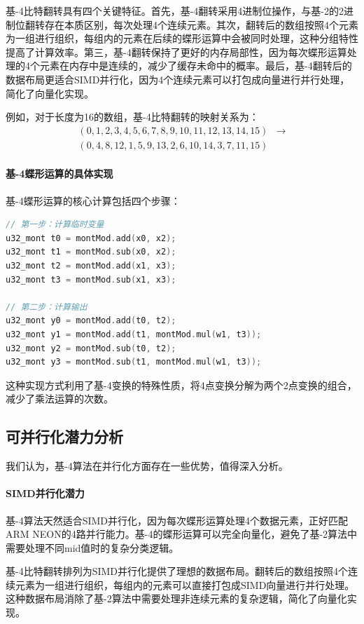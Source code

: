 \documentclass[a4paper]{article}
\begin{document}
基-4比特翻转具有四个关键特征。首先，基-4翻转采用4进制位操作，与基-2的2进制位翻转存在本质区别，每次处理4个连续元素。其次，翻转后的数组按照4个元素为一组进行组织，每组内的元素在后续的蝶形运算中会被同时处理，这种分组特性提高了计算效率。第三，基-4翻转保持了更好的内存局部性，因为每次蝶形运算处理的4个元素在内存中是连续的，减少了缓存未命中的概率。最后，基-4翻转后的数据布局更适合SIMD并行化，因为4个连续元素可以打包成向量进行并行处理，简化了向量化实现。

例如，对于长度为16的数组，基-4比特翻转的映射关系为：
\begin{align}
(0,1,2,3,4,5,6,7,8,9,10,11,12,13,14,15) &\rightarrow \\
(0,4,8,12,1,5,9,13,2,6,10,14,3,7,11,15)
\end{align}

\paragraph{基-4蝶形运算的具体实现} 基-4蝶形运算的核心计算包括四个步骤：

\begin{lstlisting}[language=C++]
// 第一步：计算临时变量
u32_mont t0 = montMod.add(x0, x2);
u32_mont t1 = montMod.sub(x0, x2);
u32_mont t2 = montMod.add(x1, x3);
u32_mont t3 = montMod.sub(x1, x3);

// 第二步：计算输出
u32_mont y0 = montMod.add(t0, t2);
u32_mont y1 = montMod.add(t1, montMod.mul(w1, t3));
u32_mont y2 = montMod.sub(t0, t2);
u32_mont y3 = montMod.sub(t1, montMod.mul(w1, t3));
\end{lstlisting}

这种实现方式利用了基-4变换的特殊性质，将4点变换分解为两个2点变换的组合，减少了乘法运算的次数。

\subsection{可并行化潜力分析}

我们认为，基-4算法在并行化方面存在一些优势，值得深入分析。

\paragraph{SIMD并行化潜力} 基-4算法天然适合SIMD并行化，因为每次蝶形运算处理4个数据元素，正好匹配ARM NEON的4路并行能力。基-4的蝶形运算可以完全向量化，避免了基-2算法中需要处理不同mid值时的复杂分类逻辑。

基-4比特翻转排列为SIMD并行化提供了理想的数据布局。翻转后的数组按照4个连续元素为一组进行组织，每组内的元素可以直接打包成SIMD向量进行并行处理。这种数据布局消除了基-2算法中需要处理非连续元素的复杂逻辑，简化了向量化实现。
\end{document}
